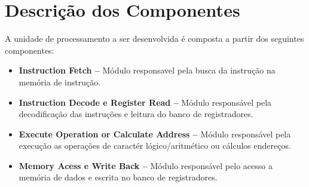 \section{Descrição dos Componentes}
  A unidade de processamento a ser desenvolvida é composta a partir dos seguintes componentes:

  \begin{itemize}
    \item \textbf{Instruction Fetch --} Módulo responsavel pela busca da instrução na memória de instrução.
    \item \textbf{Instruction Decode e Register Read --} Módulo responsável pela decodificação das instruções e leitura do banco de registradores.
    \item \textbf{Execute Operation or Calculate Address --} Módulo responsável pela execução as operações de caractér lógico/aritmético ou cálculos endereços.
     \item \textbf{Memory Acess e Write Back --} Módulo responsável pelo acesso a memória de dados e escrita no banco de registradores.
  \end{itemize}